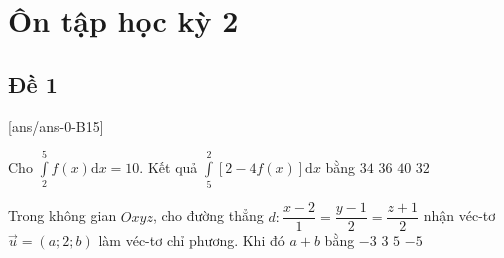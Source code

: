 \section{Ôn tập học kỳ 2}
\subsection{Đề 1}
[ans/ans-0-B15]
\caulc
\begin{ex}%
	Cho $\displaystyle\int\limits_2^5 f\left( x \right)\mathrm{d}x=10$. Kết quả $\displaystyle\int\limits_5^2 \left[ 2-4f\left( x \right) \right]\mathrm{d}x$ bằng
	\choice
	{\True $34$}
	{$36$}
	{$40$}
	{$32$}
\end{ex}    


\begin{ex}%
	Trong không gian $Oxyz$, cho đường thẳng $d\colon \dfrac{x-2}{1}=\dfrac{y-1}{2}=\dfrac{z+1}{2}$ nhận véc-tơ $\overrightarrow{u}=(a;2;b)$ làm véc-tơ chỉ phương. Khi đó $a+b$ bằng
	\choice
	{$-3$}
	{\True $3$}
	{$5$}
	{$-5$}
\end{ex}

